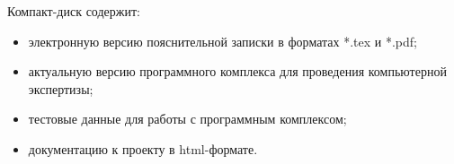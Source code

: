  
 \newpage
 

 Компакт-диск содержит: 
 \begin{itemize}
 \item электронную версию пояснительной записки в форматах *.tex и *.pdf;
 \item актуальную версию программного комплекса для проведения компьютерной экспертизы;
 \item тестовые данные для работы с программным комплексом;
 \item документацию к проекту в html-формате.
 \end{itemize}
 

